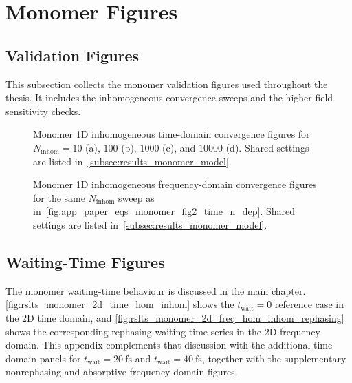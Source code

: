 \section{Monomer Figures}
\label{app:sec:paper_eqs_monomer}

\subsection{Validation Figures}

This subsection collects the monomer validation figures used throughout the
thesis. It includes the inhomogeneous convergence sweeps and the higher-field
sensitivity checks.

\begin{figure}[htbp]
    \centering
    \caption{Monomer 1D inhomogeneous time-domain convergence figures for
    $N_{\mathrm{inhom}}=10$ (a), $100$ (b), $1000$ (c), and $10000$ (d).
    Shared settings are listed in~\autoref{subsec:results_monomer_model}.}
    \label{fig:app_paper_eqs_monomer_fig2_time_n_dep}
\end{figure}

\begin{figure}[htbp]
    \centering
    \caption{Monomer 1D inhomogeneous frequency-domain convergence figures for
    the same $N_{\mathrm{inhom}}$ sweep as
    in~\autoref{fig:app_paper_eqs_monomer_fig2_time_n_dep}. Shared settings
    are listed in~\autoref{subsec:results_monomer_model}.}
    \label{fig:app_paper_eqs_monomer_fig2_freq_n_dep}
\end{figure}


\subsection{Waiting-Time Figures}

The monomer waiting-time behaviour is discussed in the main chapter.
\autoref{fig:rslts_monomer_2d_time_hom_inhom} shows the \(t_{\mathrm{wait}}=0\)
reference case in the 2D time domain, and
\autoref{fig:rslts_monomer_2d_freq_hom_inhom_rephasing} shows the corresponding
rephasing waiting-time series in the 2D frequency domain. This appendix
complements that discussion with the additional time-domain panels for
\(t_{\mathrm{wait}}=\SI{20}{\femto\second}\) and
\(t_{\mathrm{wait}}=\SI{40}{\femto\second}\), together with the supplementary
nonrephasing and absorptive frequency-domain figures.

